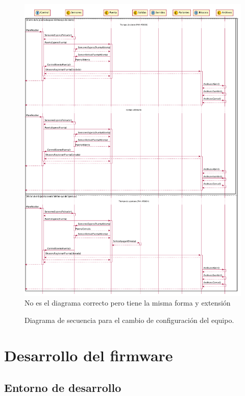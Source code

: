 \begin{figure}[ht]
	\centering
	\includegraphics[width=\textwidth]{Figures/PNK-DS002-B.pdf}
	{\color{red} No es el diagrama correcto pero tiene la misma forma y extensión}
	\caption[Secuencia para el cambio de configuración]{Diagrama de secuencia para el cambio de configuración del equipo.}
	\label{fig:SecuenciaConfiguracion}
\end{figure}

\FloatBarrier

\section{Desarrollo del firmware}
\label{sec:desarrollo}

\subsection{Entorno de desarrollo}

